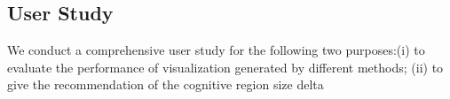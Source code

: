 \subsection{User Study}\label{sec:user}

We conduct a comprehensive user study for the following two purposes:(i) to evaluate the performance of visualization generated by different methods; (ii) to give the recommendation of the cognitive region size delta
